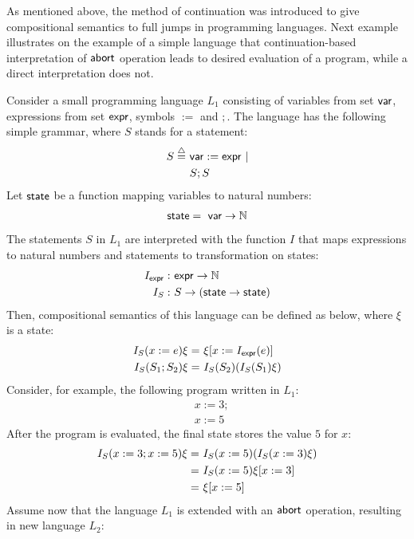 As mentioned above, the method of continuation was introduced to give compositional semantics to full jumps in programming languages. Next example illustrates on the example of a simple language that continuation-based interpretation of $\mathsf{abort}$ operation leads to desired evaluation of a program, while a direct interpretation does not.

\begin{example}
Consider a small programming language $L_1$ consisting of variables from set $\mathsf{var}$, expressions from set $\mathsf{expr}$, symbols $:=$ and $;$. The language has the following simple grammar, where $S$ stands for a statement:
\begin{align}
S  \stackrel{{\scriptstyle\triangle}}{=} \ & \mathsf{var} := \mathsf{expr} \ | \notag \\
&  S;S \notag
\end{align}
Let $\mathsf{state}$ be a function mapping variables to natural numbers:
\begin{align}
\mathsf{state} = \ \mathsf{var} \rightarrow \mathbb{N} \notag
\end{align}
The statements $S$ in $L_1$ are interpreted with the function $I$ that maps expressions to natural numbers and statements to transformation on states:
\begin{align}
I_{\mathsf{expr}}: \ & \mathsf{expr} \rightarrow \mathbb{N} \notag \\
I_{S}: \ & S \rightarrow (\mathsf{state} \rightarrow \mathsf{state}) \notag 
\end{align}
Then, compositional semantics of this language can be defined as below, where $\xi$ is a state:
\begin{align}
I_{S}(x:=e)\xi = \ & \xi[x := I_{\mathsf{expr}}(e)] \notag \\
I_{S}(S_1;S_2)\xi = \ & I_S(S_2)(I_S(S_1)\xi) \notag 
\end{align}
Consider, for example, the following program written in $L_1$:
\begin{align*}
& x:= 3; \\
& x:= 5
\end{align*}
After the program is evaluated, the final state stores the value $5$ for $x$:
\begin{align}
I_S(x:=3; x:=5)\xi  = \ & I_S(x:=5)(I_S(x:=3)\xi ) \notag \\
= \ & I_S(x:=5) \xi [ x:=3 ]  \notag \\
= \ & \xi [ x:=5] \notag
\end{align}
Assume now that the language $L_1$ is extended with an $\mathsf{abort}$ operation, resulting in new language $L_2$: 
\begin{align}

\end{align}
\end{example}
